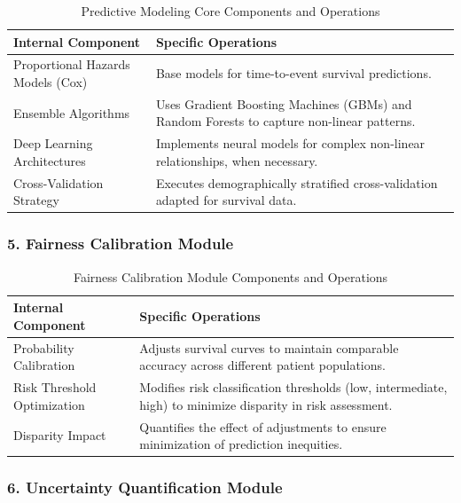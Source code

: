 \begin{table}[H]
\centering
\begin{tabular}{|p{5cm}|p{9cm}|}
\hline
\textbf{Internal Component} & \textbf{Specific Operations} \\
\hline
Proportional Hazards Models (Cox) & Base models for time-to-event survival predictions. \\
\hline
Ensemble Algorithms & Uses Gradient Boosting Machines (GBMs) and Random Forests to capture non-linear patterns. \\
\hline
Deep Learning Architectures & Implements neural models for complex non-linear relationships, when necessary. \\
\hline
Cross-Validation Strategy & Executes demographically stratified cross-validation adapted for survival data. \\
\hline
\end{tabular}
\caption{Predictive Modeling Core Components and Operations}
\label{tab:modeling_module}
\end{table}

\subsubsection{5. Fairness Calibration Module}

\begin{table}[H]
\centering
\begin{tabular}{|p{5cm}|p{9cm}|}
\hline
\textbf{Internal Component} & \textbf{Specific Operations} \\
\hline
Probability Calibration & Adjusts survival curves to maintain comparable accuracy across different patient populations. \\
\hline
Risk Threshold Optimization & Modifies risk classification thresholds (low, intermediate, high) to minimize disparity in risk assessment. \\
\hline
Disparity Impact & Quantifies the effect of adjustments to ensure minimization of prediction inequities. \\
\hline
\end{tabular}
\caption{Fairness Calibration Module Components and Operations}
\label{tab:fairness_module}
\end{table}

\subsubsection{6. Uncertainty Quantification Module}

